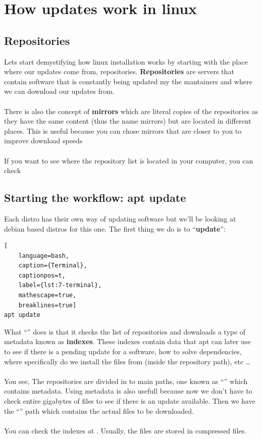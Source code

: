 \chapter{How updates work in linux}

\section{Repositories}

Lets start demystifying how linux installation works by starting with the place where our updates
come from, repositories. \textbf{Repositories} are servers that contain software that is constantly
being updated my the mantainers and where we can download our updates from. 
\\ \\
There is also the concept of \textbf{mirrors} which are literal copies of the repositories as 
they have the same content (thus the name mirrors) but are located in different places. This is
useful because you can chose mirrors that are closer to you to improve download speeds
\\ \\
If you want to see where the repository list is located in your computer, you can check 

\section{Starting the workflow: apt update}

Each distro has their own way of updating software but we'll be looking at debian based distros
for this one. The first thing we do is to ``\textbf{update}'':

\begin{lstlisting}[
    language=bash, 
    caption={Terminal},
    captionpos=t,
    label={lst:7-terminal}, 
    mathescape=true, 
    breaklines=true]
apt update
\end{lstlisting}

What ``'' does is that it checks the list of repositories and downloads a
type of metadata known as \textbf{indexes}. These indexes contain data that apt can later use to see if
there is a pending update for a software, how to solve dependencies, where specifically do we
install the files from (inside the repository path), etc \dots
\\ \\
You see, The repositories are divided in to main paths, one known as ``'' which contains metadata.
Using metadata is also usefull because now we don't have to check entire gigabytes of files to see
if there is an update available. Then we have the ``'' path which contains the actual files to
be downloaded.
\\ \\
You can check the indexes at . Usually, the files are stored in
compressed files.
\pagebreak
